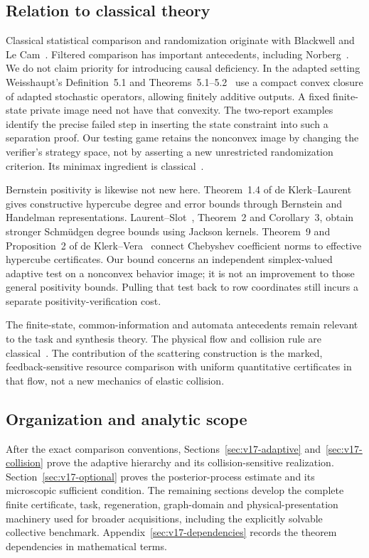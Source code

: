 \subsection{Relation to classical theory}
Classical statistical comparison and randomization originate with
Blackwell and Le Cam~\cite{Blackwell1953,LeCam1964,Torgersen1991}.
Filtered comparison has important antecedents, including
Norberg~\cite{Norberg2002}. We do not claim priority for introducing
causal deficiency. In the adapted setting Weisshaupt's
Definition~5.1 and Theorems~5.1--5.2~\cite{Weisshaupt2006} use a compact
convex closure of adapted stochastic operators, allowing finitely
additive outputs. A fixed finite-state private image need not have
that convexity. The two-report examples identify the precise failed
step in inserting the state constraint into such a separation proof.
Our testing game retains the nonconvex image by changing the verifier's
strategy space, not by asserting a new unrestricted randomization
criterion. Its minimax ingredient is classical~\cite{Sion1958}.

Bernstein positivity is likewise not new here. Theorem~1.4 of
de Klerk--Laurent~\cite{deKlerkLaurent2010} gives constructive
hypercube degree and error bounds through Bernstein and Handelman
representations. Laurent--Slot~\cite{LaurentSlot2023}, Theorem~2 and
Corollary~3, obtain stronger Schm\"udgen degree bounds using Jackson
kernels. Theorem~9 and Proposition~2 of
de Klerk--Vera~\cite{deKlerkVera2026} connect Chebyshev coefficient
norms to effective hypercube certificates. Our bound concerns an
independent simplex-valued adaptive test on a nonconvex behavior
image; it is not an improvement to those general positivity bounds.
Pulling that test back to row coordinates still incurs a separate
positivity-verification cost.

The finite-state, common-information and automata antecedents
\cite{Witsenhausen1979,NayyarMahajanTeneketzis2013,PaullUnger1959,Kiefer2020}
remain relevant to the task and synthesis theory. The physical flow
and collision rule are classical~\cite{GallagherSaintRaymondTexier}.
The contribution of the scattering construction is the marked,
feedback-sensitive resource comparison with uniform quantitative
certificates in that flow, not a new mechanics of elastic collision.

\subsection{Organization and analytic scope}
After the exact comparison conventions, Sections~\ref{sec:v17-adaptive}
and~\ref{sec:v17-collision} prove the adaptive hierarchy and its
collision-sensitive realization. Section~\ref{sec:v17-optional} proves
the posterior-process estimate and its microscopic sufficient
condition. The remaining sections develop the complete finite
certificate, task, regeneration, graph-domain and physical-presentation
machinery used for broader acquisitions, including the explicitly
solvable collective benchmark. Appendix~\ref{sec:v17-dependencies}
records the theorem dependencies in mathematical terms.

